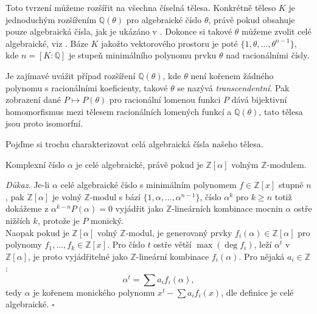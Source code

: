 \documentclass [12pt]{report}
\begin{document}
Toto tvrzení můžeme rozšířit na všechna číselná tělesa. Konkrétně těleso $K$ je jednoduchým rozšířením $\mathbb{Q}(\theta)$ pro algebraické číslo $\theta$, právě pokud obsahuje pouze algebraická čísla, jak je ukázáno v \cite[Věta 11.12]{Rosicky}. Dokonce si takové $\theta$ můžeme zvolit celé algebraické, viz \cite[Lemma 4.3.8]{Perutka}. Báze $K$ jakožto vektorového prostoru je poté $\lbrace 1,\theta,\dots,\theta ^{n-1} \rbrace$, kde $n = [K : \mathbb{Q}]$ je stupeň minimálního polynomu prvku $\theta$ nad racionálními čísly. 

\begin{poznamka} 
Je zajímavé uvážit případ rozšíření $\mathbb{Q}(\theta)$, kde $\theta$ není kořenem žádného polynomu s racionálními koeficienty, takové $\theta$ se nazývá \textit{transcendentní}. Pak zobrazení dané $P \mapsto P(\theta)$ pro racionální lomenou funkci $P$ dává bijektivní homomorfismus mezi tělesem racionálních lomených funkcí a $\mathbb{Q}(\theta)$, tato tělesa jsou proto isomorfní.
\end{poznamka}



Pojďme si trochu charakterizovat celá algebraická čísla našeho tělesa.

\begin{veta}\label{alg}
Komplexní číslo $\alpha$ je celé algebraické, právě pokud je $\mathbb{Z}[\alpha]$ volným $\mathbb{Z}$-modulem.
\end{veta}
\noindent \textit{Důkaz.} Je-li $\alpha$ celé algebraické číslo s minimálním polynomem $f \in \mathbb{Z}[x]$ stupně $n$, pak $\mathbb{Z}[\alpha]$ je volný $\mathbb{Z}$-modul s bází $\lbrace 1,\alpha,\dots,\alpha^{n-1} \rbrace$, číslo $\alpha^k$ pro $k\geqslant n$ totiž dokážeme z $\alpha^{k-n} P(\alpha) = 0$ vyjádřit jako $\mathbb{Z}$-lineárních kombinace mocnin $\alpha$ ostře nižších $k$, protože je $P$ monický.\\

Naopak pokud je $\mathbb{Z}[\alpha]$ volný $\mathbb{Z}$-modul, je generovaný prvky $f_i(\alpha) \in \mathbb{Z}[\alpha]$ pro polynomy $f_1,\dots,f_k \in \mathbb{Z}[x]$. Pro číslo $t$ ostře větší $\max{(\deg f_i)}$, leží $\alpha^t$ v $\mathbb{Z}[\alpha]$, je proto vyjádřitelné jako $\mathbb{Z}$-lineární kombinace $f_i(\alpha)$. Pro nějaká $a_i \in \mathbb{Z}$:
\begin{equation*}
\alpha^t = \sum a_i f_i(\alpha),
\end{equation*}
tedy $\alpha$ je kořenem monického polynomu $x^t - \sum a_i f_i(x)$, dle definice je celé algebraické. \hfill $\square$\\
\end{document}
